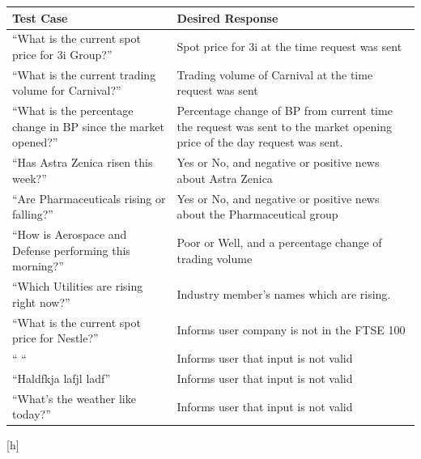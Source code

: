\documentclass[]{IEEEtran}
\begin{document}
	\begin{table}[h]
	\begin{tabular}{| m{3cm} | m{5cm} | }
		\hline
		
		Test Case & Desired Response \\
		
		\hline
		
		“What is the current spot price for 3i Group?” & Spot price for 3i at the time request was sent \\
		
		\hline
		
		“What is the current trading volume for Carnival?” & Trading volume of Carnival at the time request was sent \\
		
		\hline
		
		“What is the percentage change in BP since the market opened?” & Percentage change of BP from current time the request was sent to the market opening price of the day request was sent. \\
		
		\hline
		
		“Has Astra Zenica risen this week?” & Yes or No, and negative or positive news about Astra Zenica \\
		
		\hline 
		
		“Are Pharmaceuticals rising or falling?” & Yes or No, and negative or positive news about the Pharmaceutical group \\
		
		\hline
		
		“How is Aerospace and Defense performing this morning?” & Poor or Well, and a percentage change of trading volume \\
		
		\hline
		
		“Which Utilities are rising right now?” & Industry member's names which are rising. \\
		
		\hline
		
		“What is the current spot price for Nestle?” & Informs user company is not in the FTSE 100 \\
		
		\hline
		
		“ “ & Informs user that input is not valid \\
		
		\hline
		
		“Haldfkja lafjl ladf” & Informs user that input is not valid \\
		
		\hline 
		
		“What’s the weather like today?” & Informs user that input is not valid \\
		
		\hline
		
		
	\end{tabular}
	\end{table}[h]
	
\end{document}
